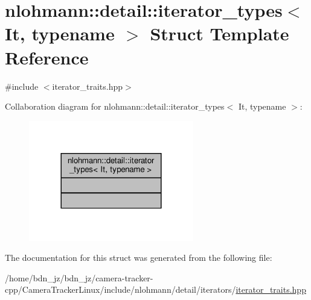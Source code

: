 \hypertarget{structnlohmann_1_1detail_1_1iterator__types}{}\section{nlohmann\+:\+:detail\+:\+:iterator\+\_\+types$<$ It, typename $>$ Struct Template Reference}
\label{structnlohmann_1_1detail_1_1iterator__types}


{\ttfamily \#include $<$iterator\+\_\+traits.\+hpp$>$}



Collaboration diagram for nlohmann\+:\+:detail\+:\+:iterator\+\_\+types$<$ It, typename $>$\+:\nopagebreak
\begin{figure}[H]
\begin{center}
\leavevmode
\includegraphics[width=204pt]{structnlohmann_1_1detail_1_1iterator__types__coll__graph}
\end{center}
\end{figure}


The documentation for this struct was generated from the following file\+:\begin{DoxyCompactItemize}
\item 
/home/bdn\+\_\+jz/bdn\+\_\+jz/camera-\/tracker-\/cpp/\+Camera\+Tracker\+Linux/include/nlohmann/detail/iterators/\hyperlink{iterator__traits_8hpp}{iterator\+\_\+traits.\+hpp}\end{DoxyCompactItemize}
